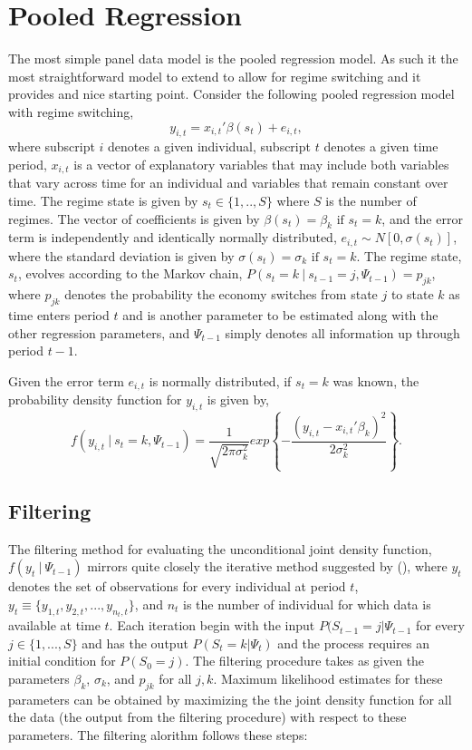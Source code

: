 \documentclass[12pt]{article}
\newcommand{\beq}{\begin{equation}}
\newcommand{\eeq}{\end{equation}}
\newcommand{\citee}[1]{\citename{#1} (\citeyear{#1})}
\begin{document}
\section{Pooled Regression}
The most simple panel data model is the pooled regression model.  As such it the most straightforward model to extend to allow for regime switching and it provides and nice starting point.  Consider the following pooled regression model with regime switching,
\beq y_{i,t} = x_{i,t}'\beta(s_t) + e_{i,t}, \eeq
where subscript $i$ denotes a given individual, subscript $t$ denotes a given time period, $x_{i,t}$ is a vector of explanatory variables that may include both variables that vary across time for an individual and variables that remain constant over time.  The regime state is given by $s_t \in \{1,..,S\}$ where $S$ is the number of regimes.  The vector of coefficients is given by $\beta(s_t) = \beta_k \mbox{ if } s_t=k$, and the error term is independently and identically normally distributed, $e_{i,t} \sim N[0, \sigma(s_t)]$, where the standard deviation is given by $\sigma(s_t) = \sigma_k \mbox{ if } s_t=k$.  The regime state, $s_t$, evolves according to the Markov chain, $P(s_t=k~|~s_{t-1}=j, \Psi_{t-1}) = p_{jk}$, where $p_{jk}$ denotes the probability the economy switches from state $j$ to state $k$ as time enters period $t$ and is another parameter to be estimated along with the other regression parameters, and $\Psi_{t-1}$ simply denotes all information up through period $t-1$.

Given the error term $e_{i,t}$ is normally distributed, if $s_t=k$ was known, the probability density function for $y_{i,t}$ is given by,
\beq \label{eq:fyit} f(y_{i,t}~|~s_t=k, \Psi_{t-1}) = \frac{1}{\sqrt{2\pi\sigma_k^2}} exp \left\{ - \frac{\left(y_{i,t} - x_{i,t}'\beta_k\right)^2}{2 \sigma_k^2} \right\}. \eeq

\subsection{Filtering}
The filtering method for evaluating the unconditional joint density function, $f(y_{t} ~|~ \Psi_{t-1})$ mirrors quite closely the iterative method suggested by \citee{hamilton1989}, where $y_t$ denotes the set of observations for every individual at period $t$, $y_t \equiv \{y_{1,t}, y_{2,t}, ..., y_{n_t,t}\}$, and $n_t$ is the number of individual for which data is available at time $t$.  Each iteration begin with the input $P(S_{t-1}=j | \Psi_{t-1}$ for every $j\in\{1,...,S\}$ and has the output $P(S_t=k | \Psi_t)$ and the process requires an initial condition for $P(S_0=j)$.  The filtering procedure takes as given the parameters $\beta_k$, $\sigma_k$, and $p_{jk}$ for all $j,k$.  Maximum likelihood estimates for these parameters can be obtained by maximizing the the joint density function for all the data (the output from the filtering procedure) with respect to these parameters.  The filtering alorithm follows these steps:
\end{document}
